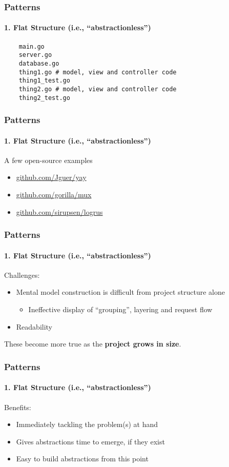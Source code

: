 \begin{frame}[fragile]
  \frametitle{Patterns}
  \framesubtitle{1. Flat Structure (i.e., ``abstractionless'')}

  \begin{verbatim}
    main.go
    server.go
    database.go
    thing1.go # model, view and controller code
    thing1_test.go
    thing2.go # model, view and controller code
    thing2_test.go
  \end{verbatim}
\end{frame}

\begin{frame}[fragile]
  \frametitle{Patterns}
  \framesubtitle{1. Flat Structure (i.e., ``abstractionless'')}

  A few open-source examples
  \begin{itemize}
    \item \url{github.com/Jguer/yay}
    \item \url{github.com/gorilla/mux}
    \item \url{github.com/sirupsen/logrus}
  \end{itemize}

\end{frame}

\begin{frame}[fragile]
  \frametitle{Patterns}
  \framesubtitle{1. Flat Structure (i.e., ``abstractionless'')}

  Challenges:
  \begin{itemize}
    \pause
    \item Mental model construction is difficult from project structure alone
    \begin{itemize}
      \item Ineffective display of ``grouping'', layering and request flow
    \end{itemize}
    \pause
    \item Readability
  \end{itemize}

  \vspace{1em}
  \centering
  \pause
  These become more true as the \textbf{project grows in size}.

\end{frame}

\begin{frame}[fragile]
  \frametitle{Patterns}
  \framesubtitle{1. Flat Structure (i.e., ``abstractionless'')}

  Benefits:
  \begin{itemize}
    \pause
    \item Immediately tackling the problem(s) at hand
    \pause
    \item Gives abstractions time to emerge, if they exist
    \pause
    \item Easy to build abstractions from this point
  \end{itemize}

\end{frame}

